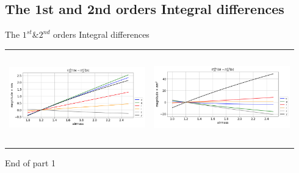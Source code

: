 \documentclass{beamer}
\begin{document}
\subsection{The 1st and 2nd orders Integral differences}
\begin{frame}{The $1^{st}$\&$2^{nd}$ orders Integral differences}

\begin{tabular}{cc}
\includegraphics[width=5.9cm, height=4cm]{figs/Integrals_II/Integrals_II10_vs_airmass.png} & \includegraphics[width=5.9cm, height=4cm]{figs/Integrals_II/Integrals_II20_vs_airmass.png}
\end{tabular}
\end{frame}


\begin{frame}
\begin{center}
{

\LARGE \alert{End of part 1}}

\end{center}

\end{frame}

 
\end{document}

